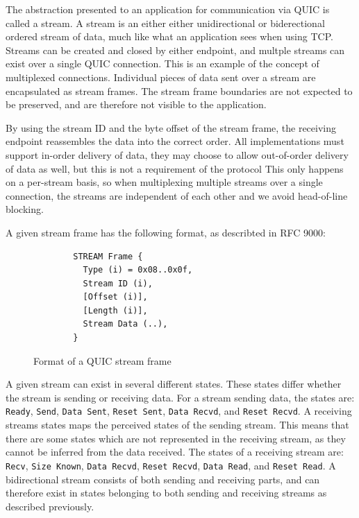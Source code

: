 The abstraction presented to an application for communication
via QUIC is called a stream. A stream is an either either
unidirectional or biderectional ordered stream of data, much
like what an application sees when using TCP. Streams can be created and
closed by either endpoint, and multple streams can exist over a
single QUIC connection. This is an example of the concept of
multiplexed connections. Individual pieces of data sent over a
stream are encapsulated as stream frames. The stream frame boundaries
are not expected to be preserved, and are therefore not visible
to the application.

By using the stream ID and the byte offset of the stream frame,
the receiving endpoint reassembles the data into the correct
order. All implementations must support in-order delivery of
data, they may choose to allow out-of-order delivery of data as
well, but this is not a requirement of the protocol This only
happens on a per-stream basis, so when multiplexing multiple
streams over a single connection, the streams are independent of
each other and we avoid head-of-line blocking.

A given stream frame has the following format, as describted in
RFC 9000:

\begin{figure}[H]
	\centering
	\begin{lstlisting}
        STREAM Frame {
          Type (i) = 0x08..0x0f,
          Stream ID (i),
          [Offset (i)],
          [Length (i)],
          Stream Data (..),
        }
    \end{lstlisting}
	\caption{Format of a QUIC stream frame \cite{iyengarQUICUDPBasedMultiplexed2021}}
	\label{fig:stream_frame_format}
\end{figure}

A given stream can exist in several different states.
These states differ whether the stream is sending or receiving
data. For a stream sending data, the states are:
\texttt{Ready}, \texttt{Send}, \texttt{Data Sent}, \texttt{Reset Sent},
\texttt{Data Recvd}, and \texttt{Reset Recvd}.
A receiving streams states maps the perceived states of the
sending stream. This means that there are some states
which are not represented in the receiving stream, as they
cannot be inferred from the data received. The states of a
receiving stream are: 
\texttt{Recv}, \texttt{Size Known}, \texttt{Data Recvd}, \texttt{Reset Recvd},
\texttt{Data Read}, and \texttt{Reset Read}.
A bidirectional stream consists of both sending and receiving parts,
and can therefore exist in states belonging to both sending and
receiving streams as described previously.


